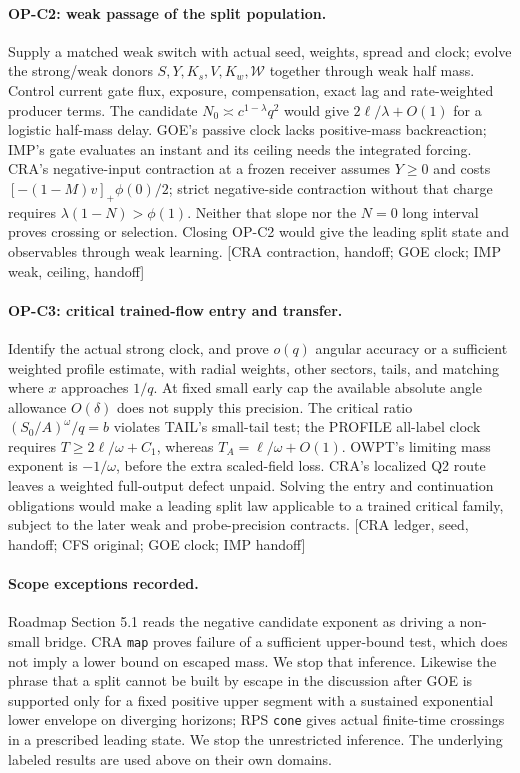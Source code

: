 \documentclass[11pt]{article}
\newcommand{\src}[1]{\textnormal{\small[#1]}}
\begin{document}
\paragraph{OP-C2: weak passage of the split population.}
Supply a matched weak switch with actual seed, weights, spread and clock;
evolve the strong/weak donors \(S,Y,K_s,V,K_w,\mathcal W\) together
through weak half mass. Control current gate flux, exposure,
compensation, exact lag and rate-weighted producer terms. The candidate
\(N_0\asymp c^{1-\lambda}q^2\) would give \(2\ell/\lambda+O(1)\)
for a logistic half-mass delay. GOE's passive clock lacks positive-mass
backreaction; IMP's gate evaluates an instant and its ceiling needs
the integrated forcing. CRA's negative-input contraction at a frozen
receiver assumes \(Y\ge0\) and costs
\([-(1-M)v]_+\phi(0)/2\); strict negative-side contraction without
that charge requires \(\lambda(1-N)>\phi(1)\). Neither that slope nor
the \(N=0\) long interval proves crossing or selection.
Closing OP-C2 would give the leading split state and observables
through weak learning. \src{CRA contraction, handoff; GOE clock; IMP weak, ceiling, handoff}

\paragraph{OP-C3: critical trained-flow entry and transfer.}
Identify the actual strong clock, and prove \(o(q)\) angular accuracy
or a sufficient weighted profile estimate, with radial weights,
other sectors, tails, and matching where \(x\) approaches \(1/q\).
At fixed small early cap the available absolute angle allowance
\(O(\delta)\) does not supply this precision. The critical ratio
\((S_0/A)^\omega/q=b\) violates TAIL's small-tail test; the
PROFILE all-label clock requires \(T\ge2\ell/\omega+C_1\), whereas
\(T_A=\ell/\omega+O(1)\). OWPT's limiting mass exponent is
\(-1/\omega\), before the extra scaled-field loss. CRA's localized
Q2 route leaves a weighted full-output defect unpaid. Solving the
entry and continuation obligations would make a leading split law
applicable to a trained critical family, subject to the later weak
and probe-precision contracts. \src{CRA ledger, seed, handoff; CFS original; GOE clock; IMP handoff}

\paragraph{Scope exceptions recorded.}
Roadmap Section 5.1 reads the negative candidate exponent as driving a
non-small bridge. CRA \texttt{map} proves failure of a sufficient
upper-bound test, which does not imply a lower bound on escaped mass.
We stop that inference. Likewise the phrase that a split cannot be
built by escape in the discussion after GOE is supported only for a
fixed positive upper segment with a sustained exponential lower
envelope on diverging horizons; RPS \texttt{cone} gives actual
finite-time crossings in a prescribed leading state. We stop the
unrestricted inference. The underlying labeled results are used above
on their own domains.
\end{document}

